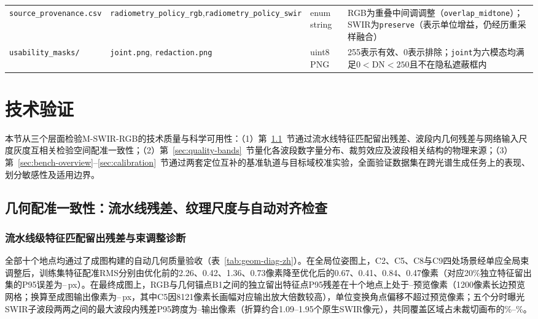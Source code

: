 \documentclass[UTF8,a4paper,10pt]{ctexart}
\begin{document}
\begin{table}[htbp]
\begin{tabularx}{\textwidth}{@{}>{\raggedright\arraybackslash}p{}>{\raggedright\arraybackslash}p{}>{\raggedright\arraybackslash}p{}>{\raggedright\arraybackslash}X@{}}
\texttt{source\_provenance.csv} & \texttt{radiometry\_policy\_rgb},\newline \texttt{radiometry\_policy\_swir} & enum string & RGB为重叠中间调调整（\texttt{overlap\_midtone}）；SWIR为\texttt{preserve}（表示单位增益，仍经历重采样融合）\\
\texttt{usability\_masks/} & \texttt{joint.png}, \texttt{redaction.png} & uint8 PNG & 255表示有效、0表示排除；\texttt{joint}为六模态均满足$0<\mathrm{DN}<250$且不在隐私遮蔽框内\\
\bottomrule
\end{tabularx}
\end{table}

\section{技术验证}\label{sec:tech}
本节从三个层面检验M-SWIR-RGB的技术质量与科学可用性：（1）第~\ref{sec:geom-val}~节通过流水线特征匹配留出残差、波段内几何残差与网络输入尺度灰度互相关检验空间配准一致性；（2）第~\ref{sec:quality-bands}~节量化各波段数字量分布、裁剪效应及波段相关结构的物理来源；（3）第~\ref{sec:bench-overview}--\ref{sec:calibration}~节通过两套定位互补的基准轨道与目标域校准实验，全面验证数据集在跨光谱生成任务上的表现、划分敏感性及适用边界。

\subsection{几何配准一致性：流水线残差、纹理尺度与自动对齐检查}\label{sec:geom-val}
\subsubsection{流水线级特征匹配留出残差与束调整诊断}
全部十个地点均通过了成图构建的自动几何质量验收（表~\ref{tab:geom-diag-zh}）。在全局位姿图上，C2、C5、C8与C9四处场景经单应全局束调整后，训练集特征配准RMS分别由优化前的2.26、0.42、1.36、0.73像素降至优化后的0.67、0.41、0.84、0.47像素（对应20\%独立特征留出集的P95误差为\GeomBaHoldoutMin--\GeomBaHoldoutMax\,px）。在最终成图上，RGB与几何锚点B1之间的独立留出特征点P95残差在十个地点上处于\GeomRgbBOnePrevMin--\GeomRgbBOnePrevMax{}预览像素（1200像素长边预览网格；换算至成图输出像素为\GeomRgbBOneOutMin--\GeomRgbBOneOutMax\,px，其中C5因8121像素长画幅对应输出放大倍数较高），单位变换角点偏移不超过\GeomCornerPrevMax{}预览像素；五个分时曝光SWIR子波段两两之间的最大波段内残差P95跨度为\GeomIntraSwirMin--\GeomIntraSwirMax{}输出像素（折算约合1.09--1.95个原生SWIR像元），共同覆盖区域占未裁切画布的\GeomCovMin\%--\GeomCovMax\%。
\end{document}
